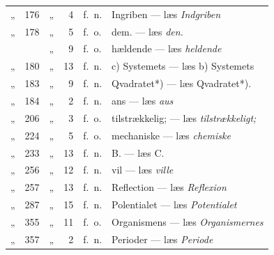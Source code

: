 \documentclass[12pt,a4paper]{book}
\begin{document}
\begin{center}
\begin{tabular}{@{}l r l r l l@{}}
„ & 176 & „ & 4 & f.\ n. & Ingriben --- læs \emph{Indgriben}\\
„ & 178 & „ & 5 & f.\ o. & dem. --- læs \emph{den.}\\
 & & „ & 9 & f.\ o. & hældende --- læs \emph{heldende}\\
„ & 180 & „ & 13 & f.\ n. & c) Systemets --- læs b) Systemets\\
„ & 183 & „ & 9 & f.\ n. & Qvadratet*) --- læs Qvadratet*).\\
„ & 184 & „ & 2 & f.\ n. & ans --- læs \emph{aus}\\
„ & 206 & „ & 3 & f.\ o. & tilstrækkelig; --- læs \emph{tilstrækkeligt;}\\
„ & 224 & „ & 5 & f.\ o. & mechaniske --- læs \emph{chemiske}\\
„ & 233 & „ & 13 & f.\ n. & B. --- læs C.\\
„ & 256 & „ & 12 & f.\ n. & vil --- læs \emph{ville}\\
„ & 257 & „ & 13 & f.\ n. & Reflection --- læs \emph{Reflexion}\\
„ & 287 & „ & 15 & f.\ n. & Polentialet --- læs \emph{Potentialet}\\
„ & 355 & „ & 11 & f.\ o. & Organismens --- læs \emph{Organismernes}\\
„ & 357 & „ & 2 & f.\ n. & Perioder --- læs \emph{Periode}\\

\end{tabular}
\end{center}
\end{document}
